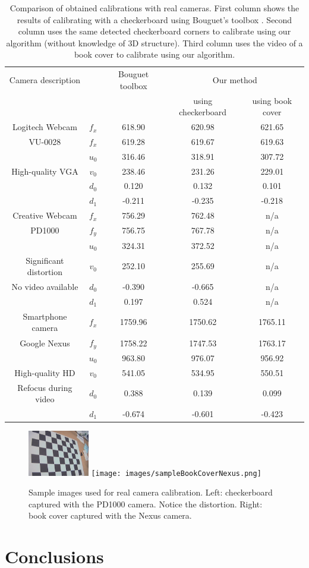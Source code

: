 \documentclass[10pt,twocolumn,letterpaper]{article}
\begin{document}
\begin{table}
\caption{Comparison of obtained calibrations with real cameras. First column shows the results of calibrating with a checkerboard using Bouguet's toolbox \cite{bouguetMCT}. Second column uses the same detected checkerboard corners to calibrate using our algorithm (without knowledge of 3D structure). Third column uses the video of a book cover to calibrate using our algorithm.}
\centering
\begin{tabular}{|c|c|c|c|c|}
\hline
Camera description & & Bouguet toolbox \cite{bouguetMCT} & \multicolumn{2}{|c|}{Our method} \\
 & & & using checkerboard & using book cover \\
 \hline
 Logitech Webcam & $f_x$ & 618.90 & 620.98 & 621.65 \\
VU-0028 & $f_x$ & 619.28 & 619.67 & 619.63 \\
 & $u_0$ & 316.46 & 318.91 &  307.72 \\
High-quality VGA & $v_0$ & 238.46 & 231.26 &  229.01 \\
 & $d_0$ & 0.120 & 0.132  &  0.101 \\
  & $d_1$ & -0.211 & -0.235 &  -0.218 \\
  \hline

Creative Webcam & $f_x$ & 756.29 & 762.48 & n/a \\
PD1000 & $f_y$ & 756.75 & 767.78 & n/a \\
& $u_0$ & 324.31 & 372.52 & n/a \\
Significant distortion& $v_0$ & 252.10 & 255.69 & n/a \\
No video available& $d_0$ & -0.390 & -0.665 & n/a \\
& $d_1$ & 0.197 & 0.524 & n/a \\
\hline

Smartphone camera & $f_x$ & 1759.96 & 1750.62 & 1765.11 \\
Google Nexus & $f_y$ & 1758.22 & 1747.53 & 1763.17 \\
& $u_0$ & 963.80 & 976.07 & 956.92 \\
High-quality HD& $v_0$ & 541.05 & 534.95 & 550.51 \\
Refocus during video & $d_0$ & 0.388 & 0.139 & 0.099 \\
& $d_1$ & -0.674 & -0.601 & -0.423 \\
\hline
\end{tabular}
\end{table}

\begin{figure}
\centering
\includegraphics[height=2cm]{images/sampleOldCam.jpg}
\texttt{[image: images/sampleBookCoverNexus.png]}
\caption{Sample images used for real camera calibration. Left: checkerboard captured with the PD1000 camera. Notice the distortion. Right: book cover captured with the Nexus camera.}
\end{figure}  



\section{Conclusions}

{\small


}
\end{document}
